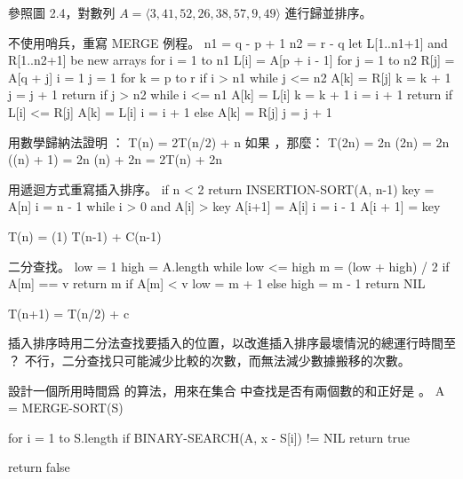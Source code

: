 \startsection[
  title={Designing algorithms},
]

\startEXERCISE
參照圖 2.4，對數列 $A=\langle 3,41,52,26,38,57,9,49\rangle$ 進行歸並排序。
\stopEXERCISE
\startANSWER
\externalfigure[output/e2_3_1-1]
\stopANSWER

\startEXERCISE
不使用哨兵，重寫 MERGE 例程。
\stopEXERCISE
\startANSWER
\startCLRS
n1 = q - p + 1
n2 = r - q
let L[1..n1+1] and R[1..n2+1] be new arrays
for i = 1 to n1
	L[i] = A[p + i - 1]
for j = 1 to n2
	R[j] = A[q + j]
i = 1
j = 1
for k = p to r
	if i > n1
		while j <= n2
			A[k] = R[j]
			k = k + 1
			j = j + 1
		return
	if j > n2
		while i <= n1
			A[k] = L[i]
			k = k + 1
			i = i + 1
		return
	if L[i] <= R[j]
		A[k] = L[i]
		i = i + 1
	else A[k] = R[j]
		j = j + 1
\stopCLRS
\stopANSWER

\startEXERCISE
用數學歸納法證明 ：
\startformula
T(n) = \startmathcases
{}		\MC {} \NR
\NC 2T(n/2) + n	\MC {} \NR
\stopmathcases
\stopformula
\stopEXERCISE
\startANSWER
如果 ，那麼：
\startformula\startalign
\NC T(2n)	\NC = 2n \lg(2n) \NR
\NC		\NC = 2n (\lg(n) + 1) \NR
\NC		\NC = 2n \lg(n) + 2n \NR
\NC		\NC = 2T(n) + 2n \NR
\stopalign\stopformula
\stopANSWER

\startEXERCISE
用遞迴方式重寫插入排序。
\stopEXERCISE
\startANSWER
{}
\startCLRS
if n < 2
	return
INSERTION-SORT(A, n-1)
key = A[n]
i = n - 1
while i > 0 and A[i] > key
	A[i+1] = A[i]
	i = i - 1
A[i + 1] = key
\stopCLRS

\startformula
T(n) = \startmathcases
\NC \Theta(1)		\MC {} \NR
\NC T(n-1) + C(n-1)	\MC {} \NR
\stopmathcases
\stopformula
\stopANSWER

二分查找。
\stopEXERCISE
\startANSWER
{}
\startCLRS
low = 1
high = A.length
while low <= high
	m = (low + high) / 2
	if A[m] == v
		return m
	if A[m] < v
		low = m + 1
	else
		high = m - 1
return NIL
\stopCLRS

\startformula
T(n+1) = T(n/2) + c
\stopformula
\stopANSWER

\startEXERCISE
插入排序時用二分法查找要插入的位置，以改進插入排序最壞情況的總運行時間至 ？
\stopEXERCISE
\startANSWER
不行，二分查找只可能減少比較的次數，而無法減少數據搬移的次數。
\stopANSWER

\startEXERCISE
設計一個所用時間爲  的算法，用來在集合  中查找是否有兩個數的和正好是 。
\stopEXERCISE
\startANSWER
{}
\startCLRS
A = MERGE-SORT(S)

for i = 1 to S.length
	if BINARY-SEARCH(A, x - S[i]) != NIL
		return true

return false
\stopCLRS
\stopANSWER

\stopsection
